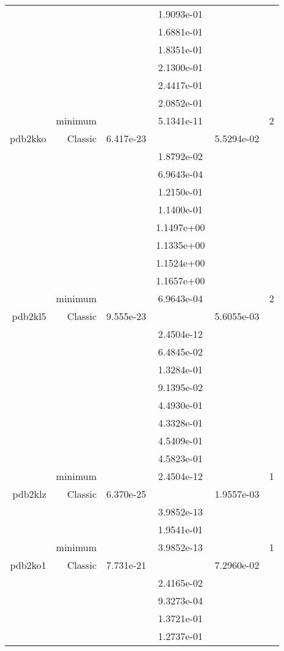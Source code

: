 \begin{xltabular}{\textwidth}{r|rS[table-format=1.3e+2]S[table-format=1.4e+2]S[table-format=1.4e+2]S[table-format=-1.5]}
&  &  & 1.9093e-01 & & \\
&  &  & 1.6881e-01 & & \\
&  &  & 1.8351e-01 & & \\
&  &  & 2.1300e-01 & & \\
&  &  & 2.4417e-01 & & \\
&  &  & 2.0852e-01 & & \\
& minimum &  & 5.1341e-11 & & 2 \\  \addlinespace
pdb2kko & Classic & 6.417e-23 &  & 5.5294e-02 & \\
&  &  & 1.8792e-02 & & \\
&  &  & 6.9643e-04 & & \\
&  &  & 1.2150e-01 & & \\
&  &  & 1.1400e-01 & & \\
&  &  & 1.1497e+00 & & \\
&  &  & 1.1335e+00 & & \\
&  &  & 1.1524e+00 & & \\
&  &  & 1.1657e+00 & & \\
& minimum &  & 6.9643e-04 & & 2 \\  \addlinespace
pdb2kl5 & Classic & 9.555e-23 &  & 5.6055e-03 & \\
&  &  & 2.4504e-12 & & \\
&  &  & 6.4845e-02 & & \\
&  &  & 1.3284e-01 & & \\
&  &  & 9.1395e-02 & & \\
&  &  & 4.4930e-01 & & \\
&  &  & 4.3328e-01 & & \\
&  &  & 4.5409e-01 & & \\
&  &  & 4.5823e-01 & & \\
& minimum &  & 2.4504e-12 & & 1 \\  \addlinespace
pdb2klz & Classic & 6.370e-25 &  & 1.9557e-03 & \\
&  &  & 3.9852e-13 & & \\
&  &  & 1.9541e-01 & & \\
& minimum &  & 3.9852e-13 & & 1 \\  \addlinespace
pdb2ko1 & Classic & 7.731e-21 &  & 7.2960e-02 & \\
&  &  & 2.4165e-02 & & \\
&  &  & 9.3273e-04 & & \\
&  &  & 1.3721e-01 & & \\
&  &  & 1.2737e-01 & & \\

\end{xltabular}
